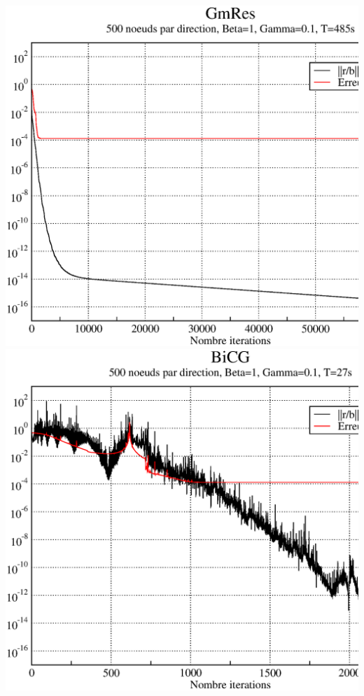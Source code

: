 \documentclass[twoside,12pt]{report}
\theoremstyle{remark}
\begin{document}
\begin{center}
\includegraphics[scale=0.36]{image/gmres_500_1_01.eps}
\includegraphics[scale=0.36]{image/bicg_500_1_01.eps}
\end{center}
\end{document}
